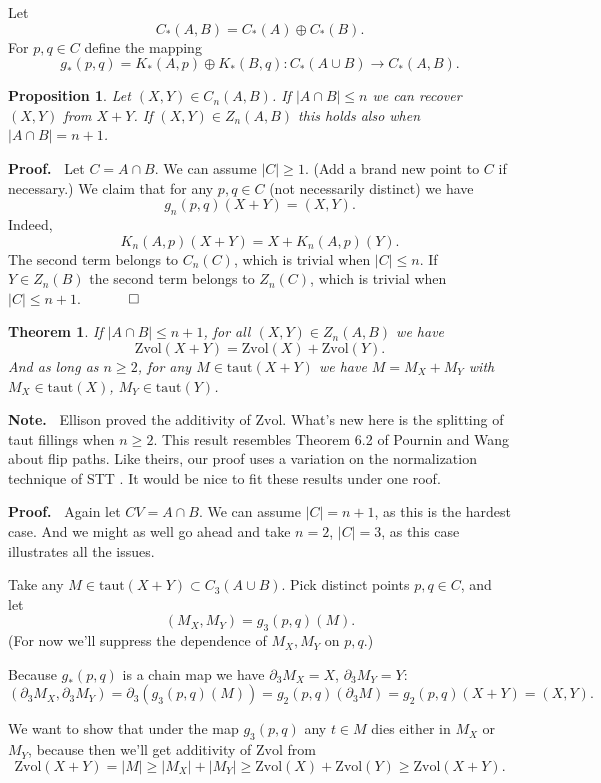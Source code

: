 \documentclass[12pt]{article}
\newtheorem{theorem}{Theorem}
\newtheorem{prop}{Proposition}
\newcommand{\proofstart}{{\noindent \bf Proof.\ }}
\newcommand{\note}{{\noindent \bf Note.\ }}
\newcommand{\proofend}{$\quad \qed$}
\def\del{\partial}
\newcommand{\union}{\cup}
\newcommand{\kw}{\mathrm}
\newcommand{\taut}{\kw{taut}}
\newcommand{\Zvol}{\kw{Zvol}}
\newcommand{\direct}{\oplus}
\begin{document}
Let
\[
C_*(A,B) = C_*(A) \direct C_*(B)
.
\]
For $p,q \in C$ define the mapping
\[
g_*(p,q) = K_*(A,p) \direct K_*(B,q):
C_*(A \cup B) \to C_*(A,B)
.
\]

\begin{prop} \label{recover}
Let $(X,Y) \in C_n(A,B)$.
If $|A \cap B| \leq n$
we can recover $(X,Y)$ from $X+Y$.
If $(X,Y) \in Z_n(A,B)$ this holds also when $|A \cap B|  = n+1$.
\end{prop}

\proofstart
Let $C=A \cap B$.
We can assume $|C| \geq 1$.
(Add a brand new point to $C$ if necessary.)
We claim that
for any $p,q \in C$
(not necessarily distinct) we have
\[
g_n(p,q)(X+Y)=(X,Y)
.
\]
Indeed,
\[
K_n(A,p)(X+Y) = X + K_n(A,p)(Y)
.
\]
The second term belongs to $C_n(C)$,
which is trivial when $|C| \leq n$.
If $Y \in Z_n(B)$ the second term belongs to $Z_n(C)$,
which is trivial when $|C| \leq n+1$.
\proofend


\begin{theorem} \label{th1}
If $|A \cap B| \leq n+1$,
for all $(X,Y) \in Z_n(A,B)$ we have
\[
\Zvol(X+Y) = \Zvol(X)+\Zvol(Y)
.
\]
And as long as $n \geq 2$,
for any $M \in \taut(X+Y)$ 
we have $M = M_X + M_Y$
with $M_X \in \taut(X)$, $M_Y \in \taut(Y)$.
\end{theorem}

\note
Ellison \cite{ellison:gap}
proved the additivity of $\Zvol$.
What's new here is the splitting of taut fillings when $n\geq 2$.
This result resembles Theorem 6.2 of
Pournin and Wang
\cite{pw:flip}
about flip paths.
Like theirs, our proof uses a variation on the normalization technique
of STT
\cite[Lemma 7]{stt:jams}.
It would be nice to fit these results under one roof.
\medskip

\proofstart
Again let $CV = A \cap B$.
We can assume $|C| = n+1$,
as this is the hardest case.
And we might as well go ahead and take $n=2$, $|C|=3$,
as this case illustrates all the issues.

Take any $M \in \taut(X+Y) \subset C_3(A \union B)$.
Pick distinct points $p,q \in C$,
and let
\[
(M_X,M_Y) = g_{3}(p,q)(M)
.
\]
(For now we'll suppress the dependence of $M_X,M_Y$ on $p,q$.)

Because $g_*(p,q)$ is a chain map we have
$\del_{3} M_X = X$, $\del_{3} M_Y = Y$:
\[
(\del_{3} M_X, \del_{3} M_Y)
=
\del_{3} (g_{3}(p,q)(M))
=
g_2(p, q)(\del_{3} M)
=
g_2(p,q)(X+Y)
=
(X,Y)
.
\]

We want to show that under the map $g_3(p,q)$ any $t \in M$
dies either in $M_X$ or $M_Y$,
because then we'll get additivity of $\Zvol$ from
\[
\Zvol(X+Y) = |M|
\geq |M_X| + |M_Y|
\geq \Zvol(X) + \Zvol(Y)
\geq \Zvol(X+Y)
.
\]
\end{document}
